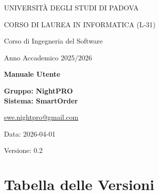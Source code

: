 \documentclass[a4paper, 11pt, oneside]{scrartcl}
\begin{document}
\thispagestyle{empty}
\begin{titlepage}
    \centering
    \vspace*{1cm}

    \vfill

    {\small UNIVERSIT\`A DEGLI STUDI DI PADOVA \par}
    {\small CORSO DI LAUREA IN INFORMATICA (L-31) \par}
    \vspace{0.5cm}
    {\large Corso di Ingegneria del Software \par}
    {\small Anno Accademico 2025/2026 \par}
    \vfill

    {\Huge \bfseries Manuale Utente \par}
    \vspace{1cm}

    \vfill

    {\Large \bfseries Gruppo: NightPRO}    \vspace{0.5cm}\\
    {\Large \bfseries Sistema: SmartOrder}    \vspace{0.5cm}

    {\large \href{mailto:swe.nightpro@gmail.com}{swe.nightpro@gmail.com}}\\[2cm]

    {\large Data: 2026-04-01 \par}

    {\Large Versione: 0.2\par}

\end{titlepage}

\newpage
\pagestyle{fancy}
\section*{Tabella delle Versioni}
\vspace{0.2cm}
\begin{center}
\end{center}
\end{document}
